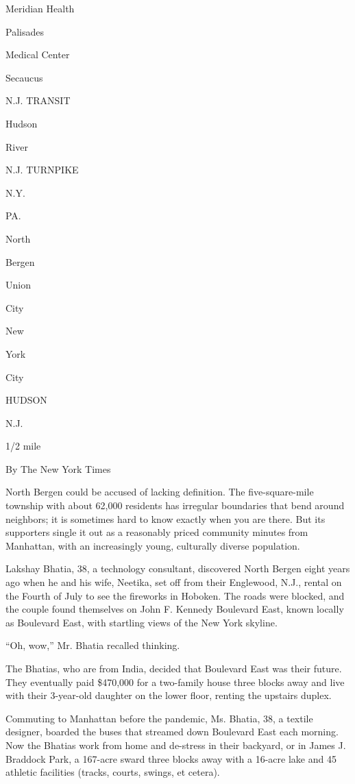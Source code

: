 Meridian Health

Palisades

Medical Center

Secaucus

N.J. TRANSIT

Hudson

River

N.J. TURNPIKE

N.Y.

PA.

North

Bergen

Union

City

New

York

City

HUDSON

N.J.

1/2 mile

By The New York Times

North Bergen could be accused of lacking definition. The
five-square-mile township with about 62,000 residents has irregular
boundaries that bend around neighbors; it is sometimes hard to know
exactly when you are there. But its supporters single it out as a
reasonably priced community minutes from Manhattan, with an increasingly
young, culturally diverse population.

Lakshay Bhatia, 38, a technology consultant, discovered North Bergen
eight years ago when he and his wife, Neetika, set off from their
Englewood, N.J., rental on the Fourth of July to see the fireworks in
Hoboken. The roads were blocked, and the couple found themselves on John
F. Kennedy Boulevard East, known locally as Boulevard East, with
startling views of the New York skyline.

``Oh, wow,'' Mr. Bhatia recalled thinking.

The Bhatias, who are from India, decided that Boulevard East was their
future. They eventually paid \$470,000 for a two-family house three
blocks away and live with their 3-year-old daughter on the lower floor,
renting the upstairs duplex.

Commuting to Manhattan before the pandemic, Ms. Bhatia, 38, a textile
designer, boarded the buses that streamed down Boulevard East each
morning. Now the Bhatias work from home and de-stress in their backyard,
or in James J. Braddock Park, a 167-acre sward three blocks away with a
16-acre lake and 45 athletic facilities (tracks, courts, swings, et
cetera).


